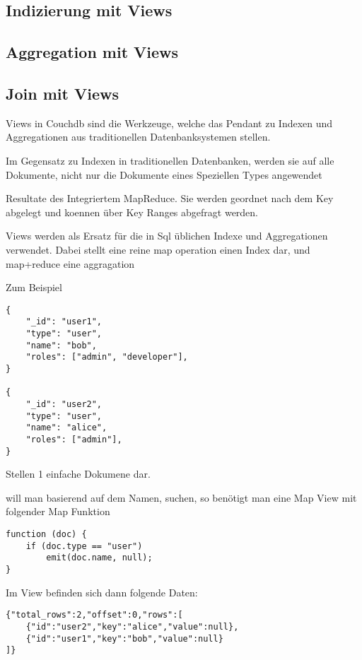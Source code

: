 \subsection{Indizierung mit Views}
\subsection{Aggregation mit Views}
\subsection{Join mit Views}



Views in Couchdb sind die Werkzeuge,
welche das Pendant zu Indexen und Aggregationen
aus traditionellen Datenbanksystemen stellen.

Im Gegensatz zu Indexen in traditionellen Datenbanken, werden sie auf alle Dokumente,
nicht nur die Dokumente eines Speziellen Types angewendet


Resultate des Integriertem MapReduce.
Sie werden geordnet nach dem Key abgelegt und koennen über Key Ranges abgefragt werden.


Views werden als Ersatz für die in Sql üblichen Indexe und Aggregationen verwendet.
Dabei stellt eine  reine map operation einen Index dar, und map+reduce eine aggragation

\newpage
Zum Beispiel

\begin{verbatim}
{
    "_id": "user1",
    "type": "user",
    "name": "bob",
    "roles": ["admin", "developer"],
}

{
    "_id": "user2",
    "type": "user",
    "name": "alice",
    "roles": ["admin"],
}
\end{verbatim}


Stellen 1 einfache Dokumene dar.

will man basierend auf dem Namen, suchen, so benötigt man eine Map View mit folgender Map Funktion

\begin{verbatim}
function (doc) {
    if (doc.type == "user")
        emit(doc.name, null);
}
\end{verbatim}

Im View befinden sich dann folgende Daten:

\begin{verbatim}
{"total_rows":2,"offset":0,"rows":[
    {"id":"user2","key":"alice","value":null},
    {"id":"user1","key":"bob","value":null}
]}
\end{verbatim}



